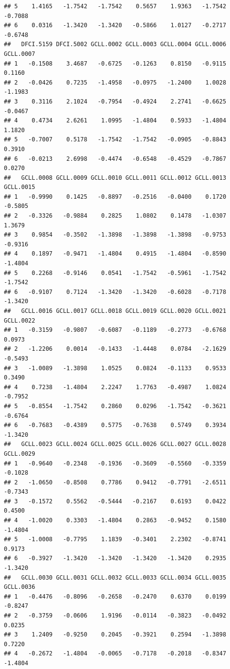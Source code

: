 \documentclass[
]{article}
\begin{document}
\begin{verbatim}
## 5    1.4165   -1.7542   -1.7542    0.5657    1.9363   -1.7542   -0.7088
## 6    0.0316   -1.3420   -1.3420   -0.5866    1.0127   -0.2717   -0.6748
##   DFCI.5159 DFCI.5002 GCLL.0002 GCLL.0003 GCLL.0004 GCLL.0006 GCLL.0007
## 1   -0.1508    3.4687   -0.6725   -0.1263    0.8150   -0.9115    0.1160
## 2   -0.0426    0.7235   -1.4958   -0.0975   -1.2400    1.0028   -1.1983
## 3    0.3116    2.1024   -0.7954   -0.4924    2.2741   -0.6625   -0.0467
## 4    0.4734    2.6261    1.0995   -1.4804    0.5933   -1.4804    1.1820
## 5   -0.7007    0.5178   -1.7542   -1.7542   -0.0905   -0.8843    0.3910
## 6   -0.0213    2.6998   -0.4474   -0.6548   -0.4529   -0.7867    0.0270
##   GCLL.0008 GCLL.0009 GCLL.0010 GCLL.0011 GCLL.0012 GCLL.0013 GCLL.0015
## 1   -0.9990    0.1425   -0.8897   -0.2516   -0.0400    0.1720   -0.5805
## 2   -0.3326   -0.9884    0.2825    1.0802    0.1478   -1.0307    1.3679
## 3    0.9854   -0.3502   -1.3898   -1.3898   -1.3898   -0.9753   -0.9316
## 4    0.1897   -0.9471   -1.4804    0.4915   -1.4804   -0.8590   -1.4804
## 5    0.2268   -0.9146    0.0541   -1.7542   -0.5961   -1.7542   -1.7542
## 6   -0.9107    0.7124   -1.3420   -1.3420   -0.6028   -0.7178   -1.3420
##   GCLL.0016 GCLL.0017 GCLL.0018 GCLL.0019 GCLL.0020 GCLL.0021 GCLL.0022
## 1   -0.3159   -0.9807   -0.6087   -0.1189   -0.2773   -0.6768    0.0973
## 2   -1.2206    0.0014   -0.1433   -1.4448    0.0784   -2.1629   -0.5493
## 3   -1.0089   -1.3898    1.0525    0.0824   -0.1133    0.9533    0.3490
## 4    0.7238   -1.4804    2.2247    1.7763   -0.4987    1.0824   -0.7952
## 5   -0.8554   -1.7542    0.2860    0.0296   -1.7542   -0.3621   -0.6764
## 6   -0.7683   -0.4389    0.5775   -0.7638    0.5749    0.3934   -1.3420
##   GCLL.0023 GCLL.0024 GCLL.0025 GCLL.0026 GCLL.0027 GCLL.0028 GCLL.0029
## 1   -0.9640   -0.2348   -0.1936   -0.3609   -0.5560   -0.3359   -0.1028
## 2   -1.0650   -0.8508    0.7786    0.9412   -0.7791   -2.6511   -0.7343
## 3   -0.1572    0.5562   -0.5444   -0.2167    0.6193    0.0422    0.4500
## 4   -1.0020    0.3303   -1.4804    0.2863   -0.9452    0.1580   -1.4804
## 5   -1.0008   -0.7795    1.1839   -0.3401    2.2302   -0.8741    0.9173
## 6   -0.3927   -1.3420   -1.3420   -1.3420   -1.3420    0.2935   -1.3420
##   GCLL.0030 GCLL.0031 GCLL.0032 GCLL.0033 GCLL.0034 GCLL.0035 GCLL.0036
## 1   -0.4476   -0.8096   -0.2658   -0.2470    0.6370    0.0199   -0.8247
## 2   -0.3759   -0.0606    1.9196   -0.0114   -0.3823   -0.0492    0.0235
## 3    1.2409   -0.9250    0.2045   -0.3921    0.2594   -1.3898    0.7220
## 4   -0.2672   -1.4804   -0.0065   -0.7178   -0.2018   -0.8347   -1.4804

\end{verbatim}
\end{document}
